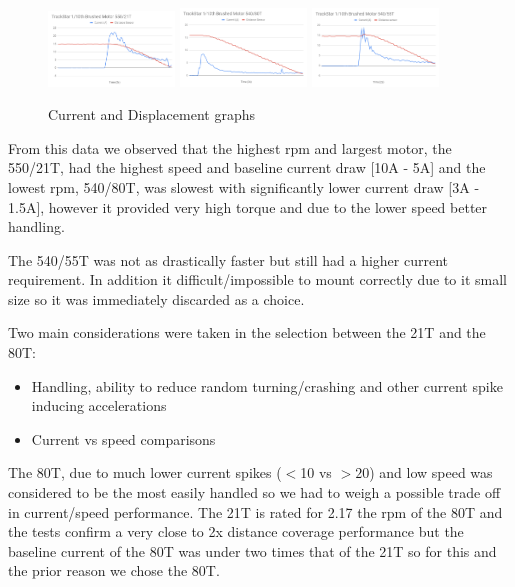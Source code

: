 \documentclass[11pt]{article}
\begin{document}
\begin{figure}[h!]
    \begin{center}
        \includegraphics[width=0.3\textwidth]{inc/large_motor.png}
        \includegraphics[width=0.3\textwidth]{inc/slow_motor.png}
        \includegraphics[width=0.3\textwidth]{inc/small_motor.png}
        \caption{Current and Displacement graphs}
    \end{center}
\end{figure}

From this data we observed that the highest rpm and largest motor, the 550/21T, had the highest speed and baseline current draw [10A - 5A] and the lowest rpm, 540/80T, was slowest with significantly lower current draw [3A - 1.5A], however it provided very high torque and due to the lower speed better handling. 

The 540/55T was not as drastically faster but still had a higher current requirement. In addition it difficult/impossible to mount correctly due to it small size so it was immediately discarded as a choice.

Two main considerations were taken in the selection between the 21T and the 80T:

\begin{itemize}
    \item Handling, ability to reduce random turning/crashing and other current spike inducing accelerations
    \item Current vs speed comparisons 
\end{itemize}

The 80T, due to much lower current spikes ($<$10 vs $>20$) and low speed was considered to be the most easily handled so we had to weigh a possible trade off in current/speed performance. The 21T is rated for 2.17 the rpm of the 80T and the tests confirm a very close to 2x distance coverage performance but the baseline current of the 80T was under two times that of the 21T so for this and the prior reason we chose the 80T.
\end{document}

